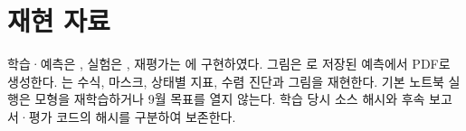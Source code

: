\documentclass[letterpaper]{article}
\begin{document}
\section*{재현 자료}
학습·예측은 , 실험은 , 재평가는 에 구현하였다. 그림은 로 저장된 예측에서 PDF로 생성한다. 는 수식, 마스크, 상태별 지표, 수렴 진단과 그림을 재현한다. 기본 노트북 실행은 모형을 재학습하거나 9월 목표를 열지 않는다. 학습 당시 소스 해시와 후속 보고서·평가 코드의 해시를 구분하여 보존한다.


\end{document}
